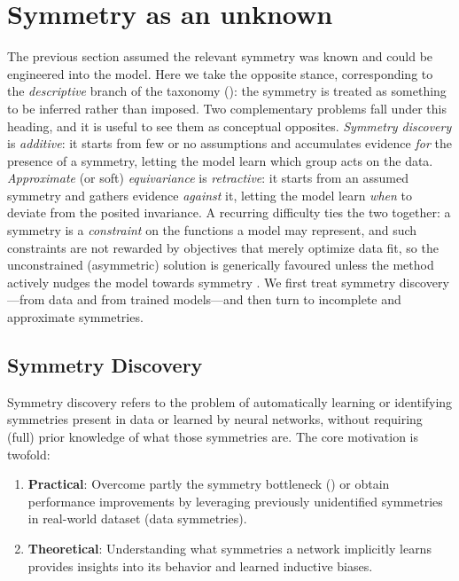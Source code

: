 \documentclass[mathematics,review,submit,moreauthors]{Definitions/mdpi}
\begin{document}
\section{Symmetry as an unknown}

The previous section assumed the relevant symmetry was known and could be engineered into the model.
Here we take the opposite stance, corresponding to the \emph{descriptive} branch of the taxonomy (): the symmetry is treated as something to be inferred rather than imposed.
Two complementary problems fall under this heading, and it is useful to see them as conceptual opposites.
\emph{Symmetry discovery} is \emph{additive}: it starts from few or no assumptions and accumulates evidence \emph{for} the presence of a symmetry, letting the model learn which group acts on the data.
\emph{Approximate} (or soft) \emph{equivariance} is \emph{retractive}: it starts from an assumed symmetry and gathers evidence \emph{against} it, letting the model learn \emph{when} to deviate from the posited invariance.
A recurring difficulty ties the two together: a symmetry is a \emph{constraint} on the functions a model may represent, and such constraints are not rewarded by objectives that merely optimize data fit, so the unconstrained (asymmetric) solution is generically favoured unless the method actively nudges the model towards symmetry \citep{ouderaa2022,benton2020anips,ouderaa2024}.
We first treat symmetry discovery---from data and from trained models---and then turn to incomplete and approximate symmetries.

\subsection{Symmetry Discovery}

Symmetry discovery refers to the problem of automatically learning or identifying symmetries present in data or learned by neural networks, without requiring (full) prior knowledge of what those symmetries are.
The core motivation is twofold:
\begin{enumerate}
    \item \textbf{Practical}: Overcome partly the symmetry bottleneck () or obtain performance improvements by leveraging previously unidentified symmetries in real-world dataset (data symmetries).
    \item \textbf{Theoretical}: Understanding what symmetries a network implicitly learns provides insights into its behavior and learned inductive biases.
\end{enumerate}
\end{document}
